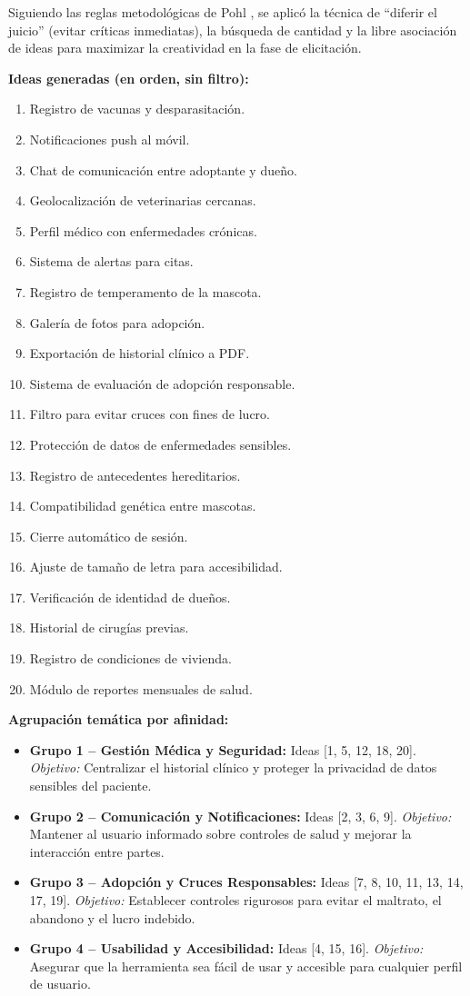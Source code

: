 \documentclass[journal,onecolumn]{IEEEtran}
\begin{document}
Siguiendo las reglas metodológicas de Pohl \cite{pohl2025}, se aplicó la
técnica de ``diferir el juicio'' (evitar críticas inmediatas), la búsqueda
de cantidad y la libre asociación de ideas para maximizar la creatividad en
la fase de elicitación.

\textbf{Ideas generadas (en orden, sin filtro):}
\begin{enumerate}[leftmargin=*]
	\item Registro de vacunas y desparasitación.
	\item Notificaciones push al móvil.
	\item Chat de comunicación entre adoptante y dueño.
	\item Geolocalización de veterinarias cercanas.
	\item Perfil médico con enfermedades crónicas.
	\item Sistema de alertas para citas.
	\item Registro de temperamento de la mascota.
	\item Galería de fotos para adopción.
	\item Exportación de historial clínico a PDF.
	\item Sistema de evaluación de adopción responsable.
	\item Filtro para evitar cruces con fines de lucro.
	\item Protección de datos de enfermedades sensibles.
	\item Registro de antecedentes hereditarios.
	\item Compatibilidad genética entre mascotas.
	\item Cierre automático de sesión.
	\item Ajuste de tamaño de letra para accesibilidad.
	\item Verificación de identidad de dueños.
	\item Historial de cirugías previas.
	\item Registro de condiciones de vivienda.
	\item Módulo de reportes mensuales de salud.
\end{enumerate}

\textbf{Agrupación temática por afinidad:}
\begin{itemize}[leftmargin=*]
	\item \textbf{Grupo 1 -- Gestión Médica y Seguridad:} Ideas [1, 5, 12, 18, 20].
	\textit{Objetivo:} Centralizar el historial clínico y proteger la
	privacidad de datos sensibles del paciente.
	\item \textbf{Grupo 2 -- Comunicación y Notificaciones:} Ideas [2, 3, 6, 9].
	\textit{Objetivo:} Mantener al usuario informado sobre controles de salud
	y mejorar la interacción entre partes.
	\item \textbf{Grupo 3 -- Adopción y Cruces Responsables:} Ideas
	[7, 8, 10, 11, 13, 14, 17, 19]. \textit{Objetivo:} Establecer controles
	rigurosos para evitar el maltrato, el abandono y el lucro indebido.
	\item \textbf{Grupo 4 -- Usabilidad y Accesibilidad:} Ideas [4, 15, 16].
	\textit{Objetivo:} Asegurar que la herramienta sea fácil de usar y
	accesible para cualquier perfil de usuario.
\end{itemize}
\end{document}
